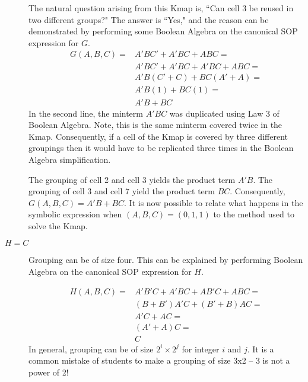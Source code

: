 \begin{changemargin}{1.5cm}{1.5cm}
\begin{description}

The natural question arising from this Kmap is, ``Can 
cell 3 be reused in two different groups?"  The answer is ``Yes," and the reason
can be demonstrated by performing some Boolean Algebra on the canonical 
SOP expression for $G$.
$$\begin{array}{ll}
G(A,B,C) =	& A'BC' + A'BC + ABC = \\
		& A'BC' + A'BC + A'BC + ABC = \\
		& A'B(C' + C) + BC(A'+A) = \\
		& A'B(1) + BC(1) = \\
		& A'B + BC 
\end{array}$$
In the second line, the minterm $A'BC$ was duplicated using Law 3 of Boolean 
Algebra.  Note, this is the same minterm covered twice in the 
Kmap.  Consequently, if a cell of the Kmap is covered by three different
groupings then it would have to be replicated three times in the Boolean 
Algebra simplification.  

The grouping of cell 2 and cell 3 yields the product term $A'B$.  The 
grouping of cell 3 and cell 7 yield the product term $BC$.  
Consequently, $G(A,B,C) = A'B + BC$.  It is now possible to relate what 
happens in the symbolic expression when $(A,B,C) = (0,1,1)$ to the method
used to solve the Kmap.

\item [$H=C$] 
Grouping can be of size four.  This can be explained by performing Boolean 
Algebra on the canonical SOP expression for $H$.

$$\begin{array}{ll}
H(A,B,C) = 	& A'B'C + A'BC + AB'C + ABC = \\
		& (B+B')A'C + (B'+B)AC =  \\
		& A'C + AC = \\
		& (A'+A)C = \\
		& C 
\end{array}$$
In general, grouping can be of size $2^i \times 2^j$ for integer $i$ and $j$.
It is a common mistake of students to make a grouping of size 3x2 --  3 is not
a power of 2!


\end{description}
\end{changemargin}
